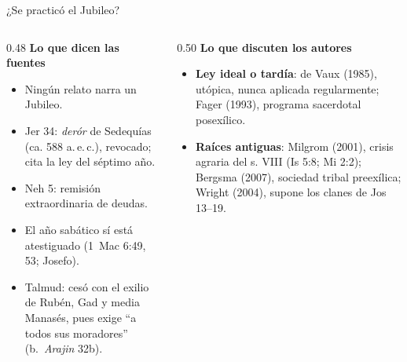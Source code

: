 \begin{frame}{¿Se practicó el Jubileo?}
\begin{columns}[t,onlytextwidth]
\begin{column}{0.48\textwidth}\scriptsize
\textbf{\textcolor{tierraroja}{Lo que dicen las fuentes}}
\begin{itemize}
\item Ningún relato narra un Jubileo.
\item Jer 34: \emph{derór} de Sedequías (ca. 588 a.\,e.\,c.), revocado; cita la ley del séptimo año.
\item Neh 5: remisión extraordinaria de deudas.
\item El año sabático sí está atestiguado (1~Mac 6:49, 53; Josefo).
\item Talmud: cesó con el exilio de Rubén, Gad y media Manasés, pues exige ``a todos sus moradores'' (b.~\emph{Arajin} 32b).
\end{itemize}
\end{column}
\begin{column}{0.50\textwidth}\scriptsize
\textbf{\textcolor{tierraroja}{Lo que discuten los autores}}
\begin{itemize}
\item \textbf{Ley ideal o tardía}: de Vaux (1985), utópica, nunca aplicada regularmente; Fager (1993), programa sacerdotal posexílico.
\item \textbf{Raíces antiguas}: Milgrom (2001), crisis agraria del s. VIII (Is 5:8; Mi 2:2); Bergsma (2007), sociedad tribal preexílica; Wright (2004), supone los clanes de Jos 13--19.
\end{itemize}
\par\justifying{}
\end{column}
\end{columns}
\end{frame}

